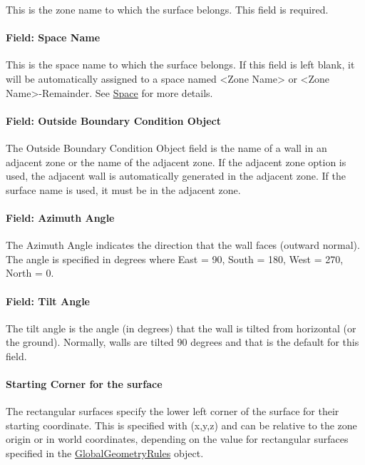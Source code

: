 This is the zone name to which the surface belongs. This field is required.

\paragraph{Field: Space Name}\label{field-space-name-3-006}

This is the space name to which the surface belongs. If this field is left blank, it will be automatically assigned to a space named <Zone Name> or <Zone Name>-Remainder. See \hyperref[space]{Space} for more details.

\paragraph{Field: Outside Boundary Condition Object}\label{field-outside-boundary-condition-object}

The Outside Boundary Condition Object field is the name of a wall in an adjacent zone or the name of the adjacent zone. If the adjacent zone option is used, the adjacent wall is automatically generated in the adjacent zone. If the surface name is used, it must be in the adjacent zone.

\paragraph{Field: Azimuth Angle}\label{field-azimuth-angle-3}

The Azimuth Angle indicates the direction that the wall faces (outward normal). The angle is specified in degrees where East = 90, South = 180, West = 270, North = 0.

\paragraph{Field: Tilt Angle}\label{field-tilt-angle-3}

The tilt angle is the angle (in degrees) that the wall is tilted from horizontal (or the ground). Normally, walls are tilted 90 degrees and that is the default for this field.

\paragraph{Starting Corner for the surface}\label{starting-corner-for-the-surface-3}

The rectangular surfaces specify the lower left corner of the surface for their starting coordinate. This is specified with (x,y,z) and can be relative to the zone origin or in world coordinates, depending on the value for rectangular surfaces specified in the \hyperref[globalgeometryrules]{GlobalGeometryRules} object.

